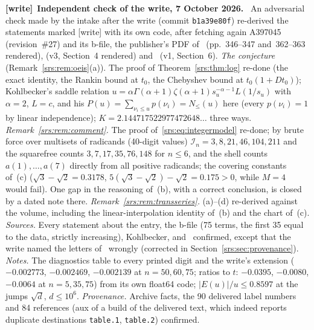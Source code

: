 \documentclass[11pt]{article}
\numberwithin{equation}{section}
\theoremstyle{remark}\newtheorem{remark}[theorem]{Remark}
\newcommand{\file}[1]{\nolinkurl{#1}}
\newenvironment{writenote}[1][]{\par\smallskip\begingroup\small
 \noindent\textbf{[write]}\if\relax\detokenize{#1}\relax\else~\textbf{#1.}\fi\ }%
 {\par\endgroup\smallskip}
\begin{document}
\begin{writenote}[Independent check of the write, 7 October 2026]
An adversarial check made by the intake after the write (commit
\file{b1a39e80f}) re-derived the statements marked [write] with its own
code, after fetching again A397045 (revision~\#27) and its b-file, the
publisher's PDF of~\cite{Kohlbecker} (pp.~346--347 and~362--363 rendered),
\cite{BJM} (v3, Section~4 rendered) and~\cite{DRZZ} (v1, Section~6).
\emph{The conjecture} (Remark~\ref{srs:rem:oeis}(a)). The proof of
Theorem~\ref{srs:thm:log} re-done (the exact identity, the Rankin bound at
$t_0$, the Chebyshev bound at $t_0(1+Dt_0)$); Kohlbecker's saddle relation
$u=\alpha\Gamma(\alpha+1)\zeta(\alpha+1)s_u^{-\alpha-1}L(1/s_u)$ with
$\alpha=2$, $L=c$, and his $P(u)=\sum_{\nu_i\le u}p(\nu_i)=N_{\le}(u)$ here
(every $p(\nu_i)=1$ by linear independence); $K=2.144717522977472648\ldots$
three ways. \emph{Remark~\ref{srs:rem:comment}.} The proof
of~\eqref{srs:eq:integermodel} re-done; by brute force over multisets of
radicands (40-digit values) $\mathcal I_n=3,8,21,46,104,211$ and the
squarefree counts $3,7,17,35,76,148$ for $n\le6$, and the shell counts
$a(1),\dots,a(7)$ directly from all positive radicands; the covering
constants of~(c) ($\sqrt3-\sqrt2=0.3178$, $5(\sqrt3-\sqrt2)-\sqrt2=0.175>0$,
while $M=4$ would fail). One gap in the reasoning of~(b), with a correct
conclusion, is closed by a dated note there. \emph{Remark~\ref{srs:rem:transseries}.}
(a)--(d) re-derived against the volume, including the linear-interpolation
identity of~(b) and the chart of~(c). \emph{Sources.} Every statement about
the entry, the b-file (75 terms, the first 35 equal to the data, strictly
increasing), Kohlbecker, \cite{BJM} and~\cite{DRZZ} confirmed, except that
the write named the letters of~\cite[Theorem~4.1]{BJM} wrongly (corrected in
Section~\ref{srs:sec:provenance}). \emph{Notes.} The diagnostics table to
every printed digit and the write's extension ($-0.002773$, $-0.002469$,
$-0.002139$ at $n=50,60,75$; ratios to $t$: $-0.0395$, $-0.0080$, $-0.0064$
at $n=5,35,75$) from its own float64 code; $|E(u)|/u\le0.8597$ at the jumps
$\sqrt d$, $d\le10^6$. \emph{Provenance.} Archive facts, the 90 delivered
label numbers and 84 references (aux of a build of the delivered text, which
indeed reports duplicate destinations \file{table.1}, \file{table.2})
confirmed.
\end{writenote}

\appendix
\end{document}
